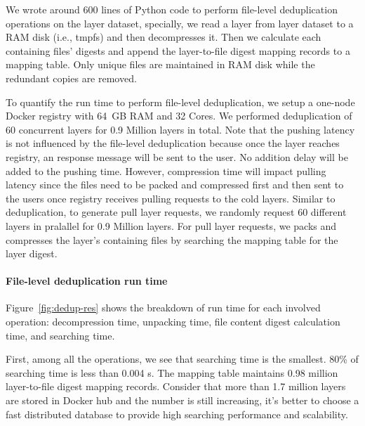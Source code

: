 We wrote around 600 lines of Python code to perform file-level deduplication
operations on the layer dataset, specially, we read a layer from layer dataset
to a RAM disk (i.e., tmpfs) and then decompresses it. 
%
Then we
calculate each containing files' digests and append the layer-to-file digest
mapping records to a mapping table. 
%
Only unique files are maintained in RAM
disk while the redundant copies are removed.

To quantify the run time to perform file-level deduplication, we setup a
one-node Docker registry with 64~GB RAM and 32 Cores.  
%
We performed
deduplication of 60 concurrent layers for 0.9 Million layers in total.
%
%
Note that the pushing latency is not influenced by the file-level deduplication
because once the layer reaches registry, an response message will be sent to
the user. 
%
No addition delay will be added to the pushing time. 
%
However,
compression time will impact pulling latency since the files need to be packed
and compressed first and then sent to the users once registry receives pulling
requests to the cold layers. 
%
Similar to deduplication, to generate pull layer
requests, we randomly request 60 different layers in pralallel for 0.9 Million
layers. 
%
For pull layer requests, we packs and compresses the layer's containing
files by searching the mapping table for the layer digest. 

\paragraph{File-level deduplication run time}

%
Figure~\ref{fig:dedup-res} shows the breakdown of run time for each
involved operation: decompression time, unpacking time, file content digest
calculation time, and searching time.

First, among all the operations, we see that searching time is the
smallest. 
%
80\% of searching time is less than 0.004 s. 
%
The mapping table
maintains 0.98 million layer-to-file digest mapping records. 
%
Consider that more
than 1.7 million layers are stored in Docker hub and the number is still
increasing, it's better to choose a fast distributed database to provide high
searching performance and scalability.
%
  
